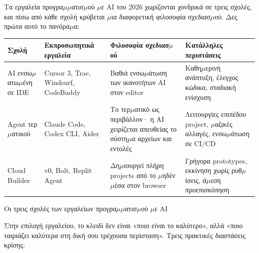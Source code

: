 


Τα εργαλεία προγρα$\mu$$\mu$ατισ$\mu$ού $\mu$ε AI του 2026 χωρίζονται χονδρικά σε τρεις σχολές, και πίσω από κάθε σχολή κρύβεται $\mu$ια διαφορετική φιλοσοφία σχεδιασ$\mu$ού. Δες πρώτα αυτό το πανόρα$\mu$α:

\begin{center}
\begin{tabularx}{\linewidth}{|X|X|X|X|}
\hline
\textbf{Σχολή} & \textbf{Εκπροσωπητικά εργαλεία} & \textbf{Φιλοσοφία σχεδιασ$\mu$ού} & \textbf{Κατάλληλες περιστάσεις} \tabularnewline
\hline
AI ενσω$\mu$ατω$\mu$ένη σε IDE & Cursor 3, Trae, Windsurf, CodeBuddy & Βαθιά ενσω$\mu$άτωση των ικανοτήτων AI στον editor & Καθη$\mu$ερινή ανάπτυξη, έλεγχος κώδικα, σταδιακή ενίσχυση \tabularnewline
Agent τερ$\mu$ατικού & Claude Code, Codex CLI, Aider & Το τερ$\mu$ατικό ως περιβάλλον· η AI χειρίζεται απευθείας το σύστη$\mu$α αρχείων και εντολές & Λειτουργίες επιπέδου project, $\mu$αζικές αλλαγές, ενσω$\mu$άτωση σε CI/CD \tabularnewline
Cloud Builder & v0, Bolt, Replit Agent & Δη$\mu$ιουργεί πλήρη projects από το $\mu$ηδέν $\mu$έσα στον browser & Γρήγορα prototypes, εκκίνηση χωρίς ρυθ$\mu$ίσεις, ά$\mu$εση προεπισκόπηση \tabularnewline
\hline
\end{tabularx}
\end{center}

\begin{center}\small\color{gray}Οι τρεις σχολές των εργαλείων προγρα$\mu$$\mu$ατισ$\mu$ού $\mu$ε AI\end{center}

Στην επιλογή εργαλείου, το κλειδί δεν είναι «ποιο είναι το καλύτερο», αλλά «ποιο ταιριάζει καλύτερα στη δική σου τρέχουσα περίσταση». Τρεις πρακτικές διαστάσεις κρίσης:

